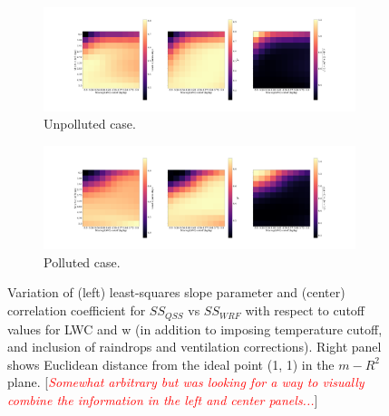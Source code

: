 \documentclass{article}
\newcommand{\klcomm}[1]{\textcolor{red}{\textit{#1}}}
\begin{document}
\begin{figure}[ht]
	\centering
	\begin{subfigure}{1.5\textwidth}
		\includegraphics[width=\textwidth]{revmywrf/v3_regres_param_heatmaps_Unpolluted_figure.png}
		\caption{Unpolluted case.}
		\label{regresheatmapunpoll}
	\end{subfigure}
	\begin{subfigure}{1.5\textwidth}
		\includegraphics[width=\textwidth]{revmywrf/v3_regres_param_heatmaps_Polluted_figure.png}
		\caption{Polluted case.}
		\label{regresheatmappoll}
	\end{subfigure}
	\caption{Variation of (left) least-squares slope parameter and (center) correlation coefficient for $SS_{QSS}$ vs $SS_{WRF}$ with respect to cutoff values for LWC and w (in addition to imposing temperature cutoff, and inclusion of raindrops and ventilation corrections). Right panel shows Euclidean distance from the ideal point (1, 1) in the $m-R^2$ plane. [\klcomm{Somewhat arbitrary but was looking for a way to visually combine the information in the left and center panels...}]}
	\label{regresheatmap}
\end{figure}
\end{document}
